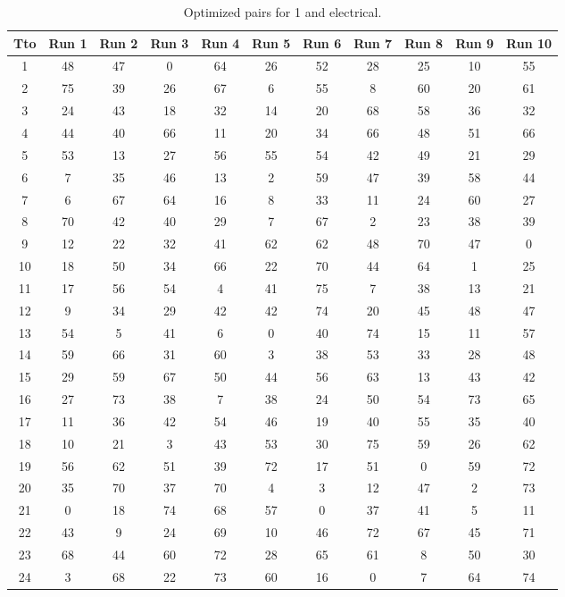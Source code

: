\begin{table}
  \centering
  \scriptsize
  \caption{Optimized pairs for 1 and electrical.}
  \label{tab_pairs}
\begin{tabular}{c c c c c c c c c c c }
\hline
Tto & Run 1 & Run 2 & Run 3 & Run 4 & Run 5 & Run 6 & Run 7 & Run 8 & Run 9 & Run 10 \\
\hline
1 & 48 & 47 & 0 & 64 & 26 & 52 & 28 & 25 & 10 & 55 \\
2 & 75 & 39 & 26 & 67 & 6 & 55 & 8 & 60 & 20 & 61 \\
3 & 24 & 43 & 18 & 32 & 14 & 20 & 68 & 58 & 36 & 32 \\
4 & 44 & 40 & 66 & 11 & 20 & 34 & 66 & 48 & 51 & 66 \\
5 & 53 & 13 & 27 & 56 & 55 & 54 & 42 & 49 & 21 & 29 \\
6 & 7 & 35 & 46 & 13 & 2 & 59 & 47 & 39 & 58 & 44 \\
7 & 6 & 67 & 64 & 16 & 8 & 33 & 11 & 24 & 60 & 27 \\
8 & 70 & 42 & 40 & 29 & 7 & 67 & 2 & 23 & 38 & 39 \\
9 & 12 & 22 & 32 & 41 & 62 & 62 & 48 & 70 & 47 & 0 \\
10 & 18 & 50 & 34 & 66 & 22 & 70 & 44 & 64 & 1 & 25 \\
11 & 17 & 56 & 54 & 4 & 41 & 75 & 7 & 38 & 13 & 21 \\
12 & 9 & 34 & 29 & 42 & 42 & 74 & 20 & 45 & 48 & 47 \\
13 & 54 & 5 & 41 & 6 & 0 & 40 & 74 & 15 & 11 & 57 \\
14 & 59 & 66 & 31 & 60 & 3 & 38 & 53 & 33 & 28 & 48 \\
15 & 29 & 59 & 67 & 50 & 44 & 56 & 63 & 13 & 43 & 42 \\
16 & 27 & 73 & 38 & 7 & 38 & 24 & 50 & 54 & 73 & 65 \\
17 & 11 & 36 & 42 & 54 & 46 & 19 & 40 & 55 & 35 & 40 \\
18 & 10 & 21 & 3 & 43 & 53 & 30 & 75 & 59 & 26 & 62 \\
19 & 56 & 62 & 51 & 39 & 72 & 17 & 51 & 0 & 59 & 72 \\
20 & 35 & 70 & 37 & 70 & 4 & 3 & 12 & 47 & 2 & 73 \\
21 & 0 & 18 & 74 & 68 & 57 & 0 & 37 & 41 & 5 & 11 \\
22 & 43 & 9 & 24 & 69 & 10 & 46 & 72 & 67 & 45 & 71 \\
23 & 68 & 44 & 60 & 72 & 28 & 65 & 61 & 8 & 50 & 30 \\
24 & 3 & 68 & 22 & 73 & 60 & 16 & 0 & 7 & 64 & 74 \\

\end{tabular}
\end{table}
